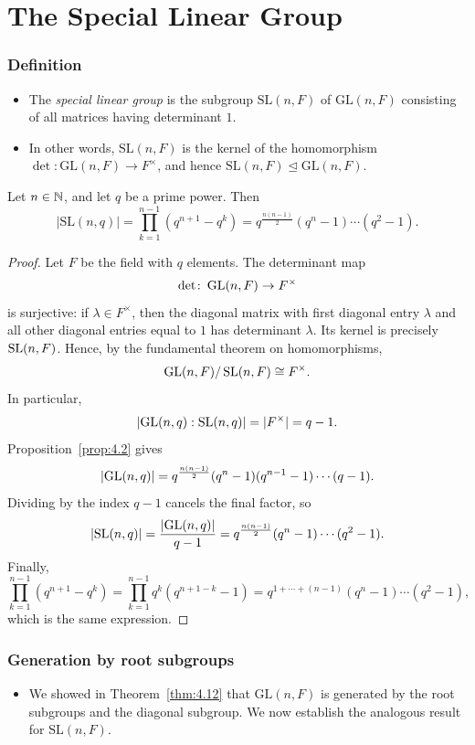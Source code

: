 \documentclass[../Odyssey_Project.tex]{subfiles}
\begin{document}
\setcounter{section}{5}
\section{The Special Linear Group}

\subsubsection*{Definition}
\begin{itemize}
    \item The \emph{special linear group} is the subgroup $\mathrm{SL}(n,F)$ of $\mathrm{GL}(n,F)$ consisting of all matrices having determinant $1$.
    \item In other words, $\mathrm{SL}(n,F)$ is the kernel of the homomorphism $\det\colon \mathrm{GL}(n,F) \to F^{\times}$, and hence $\mathrm{SL}(n,F) \trianglelefteq \mathrm{GL}(n,F)$.
\end{itemize}

\begin{proposition}
\label{prop:6.1}
Let $n \in \mathbb{N}$, and let $q$ be a prime power. Then
\[
|\mathrm{SL}(n,q)| = \prod_{k=1}^{n-1}(q^{n+1}-q^k) = q^{\frac{n(n-1)}{2}}(q^n-1)\cdots(q^2-1).
\]
\end{proposition}
\begin{proof}
Let $F$ be the field with $q$ elements. The determinant map
\[
    \det\colon \operatorname{GL}(n,F)\to F^\times
\]
is surjective: if $\lambda\in F^\times$, then the diagonal matrix with first diagonal entry $\lambda$ and all other diagonal entries equal to $1$ has determinant $\lambda$. Its kernel is precisely $\operatorname{SL}(n,F)$. Hence, by the fundamental theorem on homomorphisms,
\[
    \operatorname{GL}(n,F)/\operatorname{SL}(n,F)\cong F^\times.
\]
In particular,
\[
    \lvert \operatorname{GL}(n,q) : \operatorname{SL}(n,q) \rvert=\lvert F^\times\rvert=q-1.
\]
Proposition~\ref{prop:4.2} gives
\[
    \lvert \operatorname{GL}(n,q)\rvert
    =q^{\frac{n(n-1)}{2}}(q^n-1)(q^{n-1}-1)\cdots(q-1).
\]
Dividing by the index $q-1$ cancels the final factor, so
\[
    \lvert \operatorname{SL}(n,q)\rvert
    =\frac{\lvert \operatorname{GL}(n,q)\rvert}{q-1}
    =q^{\frac{n(n-1)}{2}}(q^n-1)\cdots(q^2-1).
\]
Finally,
\[
    \prod_{k=1}^{n-1}(q^{n+1}-q^k)
    =\prod_{k=1}^{n-1}q^k(q^{n+1-k}-1)
    =q^{1+\cdots+(n-1)}(q^n-1)\cdots(q^2-1),
\]
which is the same expression.
\end{proof}

\subsubsection*{Generation by root subgroups}
\begin{itemize}
    \item We showed in Theorem~\ref{thm:4.12} that $\mathrm{GL}(n,F)$ is generated by the root subgroups and the diagonal subgroup. We now establish the analogous result for $\mathrm{SL}(n,F)$.
\end{itemize}
\end{document}
